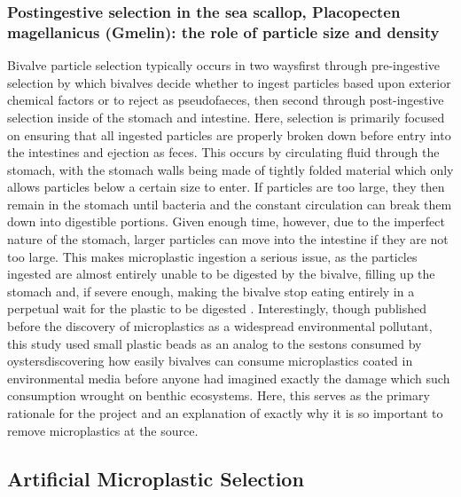 \documentclass[fleqn,10pt]{SelfArx} %
\begin{document}
	\subsubsection*{Postingestive selection in the sea scallop, Placopecten magellanicus (Gmelin): the role of particle size and density}
	Bivalve particle selection typically occurs in two ways\textemdash first through pre-ingestive selection by which bivalves decide whether to ingest particles based upon exterior chemical factors or to reject as pseudofaeces, then second through post-ingestive selection inside of the stomach and intestine. Here, selection is primarily focused on ensuring that all ingested particles are properly broken down before entry into the intestines and ejection as feces. This occurs by circulating fluid through the stomach, with the stomach walls being made of tightly folded material which only allows particles below a certain size to enter. If particles are too large, they then remain in the stomach until bacteria and the constant circulation can break them down into digestible portions. Given enough time, however, due to the imperfect nature of the stomach, larger particles can move into the intestine if they are not too large. This makes microplastic ingestion a serious issue, as the particles ingested are almost entirely unable to be digested by the bivalve, filling up the stomach and, if severe enough, making the bivalve stop eating entirely in a perpetual wait for the plastic to be digested \cite{Brillant_MacDonald_2000}.
	\linebreak
	Interestingly, though published before the discovery of microplastics as a widespread environmental pollutant, this study used small plastic beads as an analog to the \glspl{seston} consumed by oysters\textemdash discovering how easily bivalves can consume microplastics coated in environmental media before anyone had imagined exactly the damage which such consumption wrought on \gls{benthic} ecosystems. Here, this serves as the primary rationale for the project and an explanation of exactly why it is so important to remove microplastics at the source.
	
	\subsection{Artificial Microplastic Selection}
\end{document}
